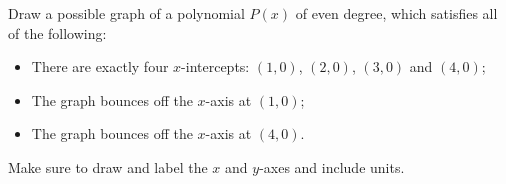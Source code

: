 \documentclass[11pt,answers]{exam}
\begin{document}
\begin{questions}
\begin{parts}
\fillwithdottedlines{3cm}

\end{parts}

\bonusquestion[2]  Draw a possible graph of a polynomial $P(x)$ of even degree, which satisfies all of the following:
\begin{itemize}
	\item There are exactly four $x$-intercepts:  $(1,0)$, $(2,0)$, $(3,0)$ and $(4,0)$;
	\item The graph bounces off the $x$-axis at $(1,0)$;
	\item The graph bounces off the $x$-axis at $(4,0)$.
	
\end{itemize}   

Make sure to draw and label the $x$ and $y$-axes and include units.


\end{questions}
\end{document}
